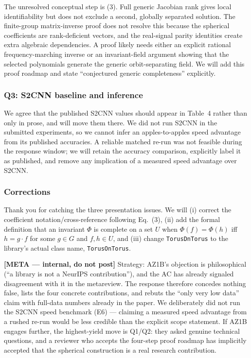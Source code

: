 \documentclass[10pt]{article}
\newenvironment{metacomment}%
  {\par\medskip\noindent\begingroup%
   \setlength{\fboxsep}{8pt}%
   \noindent\begin{lrbox}{\metabox}\begin{minipage}{\dimexpr\linewidth-2\fboxsep\relax}%
   \small\sffamily\color{metablue}%
   \textbf{[META --- internal, do not post]}\quad}%
  {\end{minipage}\end{lrbox}%
   \noindent\colorbox{metabg}{\usebox{\metabox}}\endgroup\par\medskip}
\begin{document}
The unresolved conceptual step is (3). Full generic Jacobian rank gives local
identifiability but does not exclude a second, globally separated solution.
The finite-group matrix-inverse proof does not resolve this because the
spherical coefficients are rank-deficient vectors, and the real-signal parity
identities create extra algebraic dependencies. A proof likely needs either
an explicit rational frequency-marching inverse or an invariant-field
argument showing that the selected polynomials generate the generic
orbit-separating field. We will add this proof roadmap and state
``conjectured generic completeness'' explicitly.

\subsubsection*{Q3: S2CNN baseline and inference}

We agree that the published S2CNN values should appear in Table~4 rather than
only in prose, and will move them there. We did not run S2CNN in the
submitted experiments, so we cannot infer an apples-to-apples speed advantage
from its published accuracies. A reliable matched re-run was not feasible
during the response window; we will retain the accuracy comparison,
explicitly label it as published, and remove any implication of a measured
speed advantage over S2CNN.

\subsubsection*{Corrections}

Thank you for catching the three presentation issues. We will (i) correct the
coefficient notation/cross-reference following Eq.~(3), (ii) add the formal
definition that an invariant $\Phi$ is complete on a set $U$ when
$\Phi(f)=\Phi(h)$ iff $h=g\!\cdot\!f$ for some $g\in G$ and $f,h\in U$, and
(iii) change \texttt{TorusDnTorus} to the library's actual class name,
\texttt{TorusOnTorus}.

\begin{metacomment}
Strategy: AZ1B's objection is philosophical (``a library is not a NeurIPS
contribution''), and the AC has already signaled disagreement with it in the
metareview. The response therefore concedes nothing false, lists the four
concrete contributions, and rebuts the ``only very low data'' claim with
full-data numbers already in the paper. We deliberately did not run the S2CNN
speed benchmark (E6) --- claiming a measured speed advantage from a rushed
re-run would be less credible than the explicit scope statement. If AZ1B
engages further, the highest-yield move is Q1/Q2: they asked genuine
technical questions, and a reviewer who accepts the four-step proof roadmap
has implicitly accepted that the spherical construction is a real research
contribution.
\end{metacomment}
\end{document}
